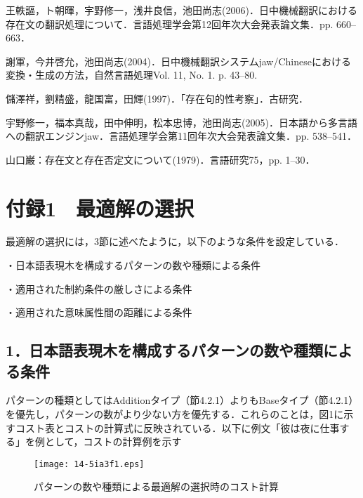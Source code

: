 \documentclass[japanese]{jnlp_1.4}
\begin{document}
\begin{thebibliography}{3}
\item
王軼謳，ト朝暉，宇野修一，浅井良信，池田尚志(2006)．日中機械翻訳における存在文の翻訳処理について．言語処理学会第12回年次大会発表論文集．pp. 660--663．

\item
謝軍，今井啓允，池田尚志(2004)．日中機械翻訳システムjaw/Chineseにおける変換・生成の方法，自然言語処理Vol. 11, No. 1. p. 43--80.

\item
儲澤祥，劉精盛，龍国富，田輝(1997)．「存在句的性考察」．古研究．

\item
宇野修一，福本真哉，田中伸明，松本忠博，池田尚志(2005)．日本語から多言語への翻訳エンジンjaw．言語処理学会第11回年次大会発表論文集．pp. 538--541．

\item
山口巌：存在文と存在否定文について(1979)．言語研究75，pp. 1--30．


\end{thebibliography}




\clearpage

\section*{付録1　最適解の選択}

最適解の選択には，3節に述べたように，以下のような条件を設定している．

\noindent
・日本語表現木を構成するパターンの数や種類による条件

\noindent
・適用された制約条件の厳しさによる条件

\noindent
・適用された意味属性間の距離による条件


\subsection*{1．日本語表現木を構成するパターンの数や種類による条件}

パターンの種類としてはAdditionタイプ（節4.2.1）よりもBaseタイプ（節4.2.1）を優先し，パターンの数がより少ない方を優先する．これらのことは，図1に示すコスト表とコストの計算式に反映されている．以下に例文「彼は夜に仕事する」を例として，コストの計算例を示す

\begin{figure}[b]
\begin{center}
\texttt{[image: 14-5ia3f1.eps]}
\end{center}
 \caption{パターンの数や種類による最適解の選択時のコスト計算}
\end{figure}
\end{document}
